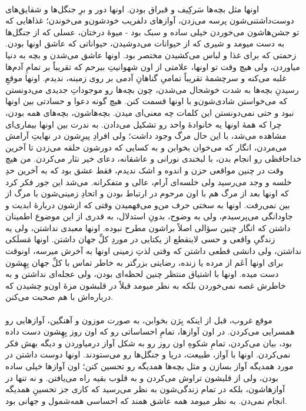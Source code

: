\documentclass[12pt]{book}
\begin{document}
    \paragraph{}
    اونها مثل بچه‌ها سَرکِیف و قبراق بودن. اونها دور و برِ جنگل‌ها و شقایق‌های دوست‌داشتنی‌شون پرسه می‌زدن، آوازهای دلفریب خودشون‌و می‌خوندن؛ غذاهایی که تو جشن‌هاشون می‌خوردن خیلی ساده و سبک بود - میوهٔ درختان، عسلی که از جنگل‌ها به دست میومد و شیری که از حیوانات می‌دوشیدن، حیواناتی که عاشق اونها بودن. زحمتی که برای غذا و لباس می‌کشیدن مختصر بود. اونها عاشق می‌شدن و بچه به دنیا میاوردن، ولی هیچ وقت تو اونها، علامتی از اون شهوانیتِ بیرحم که تقریباً بر تمامِ آدم‌ها غلبه می‌کنه  و سرچشمهٔ تقریباً تمامیِ گناهانِ آدمی بر روی زمینه، ندیدم. اونها موقعِ رسیدنِ بچه‌ها به شدت خوشحال می‌شدن، چون بچه‌ها رو موجوداتِ جدیدی می‌دونستن که می‌خواستن شادی‌شون‌و با اونها قسمت کنن. هیچ گونه دعوا و حسادتی بین اونها نبود و حتی نمی‌دونستن این کلمات چه معنی‌ای میدن. بچه‌هاشون، بچه‌های همه بودن، چرا که همهٔ اونها یه خانوادهٔ واحد رو تشکیل می‌دادن. به ندرت بین اونها بیماری‌ای مشاهده می‌شد، با این حال مرگ وجود داشت؛ ولی افرادِ پیرِشون در نهایتِ آرامش می‌مردن، انگار که می‌خوان بخوابن و به کسایی که دورشون حلقه می‌زدن تا آخرین خداحافظی رو انجام بدن، با لبخندی نورانی و عاشقانه، دعای خیر نثار می‌کردن. من هیچ وقت در چنین مواقعی حزن و اندوه و اشک ندیدم، فقط عشق بود که به آخرین حدِ خلسه و وجد می‌رسید ولی خلسه‌ای آرام، عالی و متفکرانه. می‌شد این جور فکر کرد که اونها بعد از مرگ هم با اون مرحوم در ارتباط بودن و اتحادِ زمینی‌شون با مرگ از بین نمی‌رفت. اونها به سختی حرف من‌و می‌فهمیدن وقتی که ازشون دربارهٔ ابدیت و جاودانگی می‌پرسیدم، ولی به وضوح، بدونِ استدلال، به قدری از این موضوع اطمینان داشتن که انگار چنین سؤالی اصلاً براشون مطرح نبوده. اونها معبدی نداشتن، ولی یه زندگیِ واقعی و حسی لاینقطع از یکتایی در موردِ کلِّ جهان داشتن. اونها مَسلَکی نداشتن، ولی دانشی قطعی داشتن که وقتی لذتِ زمینی اونها به آخرش میرسه، اونوقت برای اونها اَعَم از مرده یا زنده، رضایتی بزرگتر به خاطر تماس با کلِّ جهان بِهِشون دست میده. اونها با اشتیاق منتظر چنین لحظه‌ای بودن، ولی عجله‌ای نداشتن و به خاطرش غصه نمی‌خوردن بلکه به نظر میومد قبلاً در قلبشون مزهٔ اون‌و چشیدن که درباره‌اش با هم صحبت می‌کنن.

    \paragraph{}
    موقع غروب، قبل از اینکه بِرَن بخوابن، به صورت موزون و آهنگین، آوازهایی رو همسرایی می‌کردن. در اون آوازها، تمامِ احساساتی رو که اون روز بِهِشون دست داده بود، بیان می‌کردن، تمامِ شکوهِ اون روز رو به شکل آواز درمیاوردن و دیگه بهش فکر نمی‌کردن. اونها با آواز، طبیعت، دریا و جنگل‌ها رو می‌ستودند. اونها دوست داشتن در مورد همدیگه آواز بسازن و مثل بچه‌ها همدیگه رو تحسین کنن؛ اون آوازها خیلی ساده بودن، ولی از قلبشون تراوش می‌کردن و به قلوب بقیه راه می‌یافتن. و نه تنها در آوازهاشون، بلکه در تمام زندگی‌شون به نظر می‌رسید که کاری جز تحسینِ همدیگه انجام نمی‌دن. به نظر میومد همه عاشق همند که احساسی همه‌شمول و جهانی بود.
\end{document}
